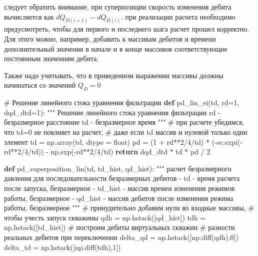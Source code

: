 \documentclass[
  russian,
  letterpaper,
  DIV=11,
  numbers=noendperiod,
  oneside]{scrartcl}
\newenvironment{Shaded}{\begin{snugshade}}{\end{snugshade}}
\newcommand{\BuiltInTok}[1]{\textcolor[rgb]{0.00,0.23,0.31}{#1}}
\newcommand{\CommentTok}[1]{\textcolor[rgb]{0.37,0.37,0.37}{#1}}
\newcommand{\ControlFlowTok}[1]{\textcolor[rgb]{0.00,0.23,0.31}{\textbf{#1}}}
\newcommand{\DecValTok}[1]{\textcolor[rgb]{0.68,0.00,0.00}{#1}}
\newcommand{\KeywordTok}[1]{\textcolor[rgb]{0.00,0.23,0.31}{\textbf{#1}}}
\newcommand{\NormalTok}[1]{\textcolor[rgb]{0.00,0.23,0.31}{#1}}
\newcommand{\OperatorTok}[1]{\textcolor[rgb]{0.37,0.37,0.37}{#1}}
\begin{document}
следует обратить внимание, при суперпозиции скорость изменения дебита
вычисляется как \(dQ_{D(i+1)} - dQ_{D(i)}\). при реализации расчета
необходимо предусмотреть, чтобы для первого и последнего шага расчет
прошел корректно. Для этого можно, например, добавить к массивам дебитов
и времени дополнительный значения в начале и в конце массивов
соответствующие постоянным значениям дебита.

Также надо учитывать, что в приведенном выражении массивы должны
начинаться со значений \(Q_D=0\)

\begin{Shaded}
\begin{Highlighting}[]
\CommentTok{\# Решение линейного стока уравнения фильтрации}
\KeywordTok{def}\NormalTok{ pd\_lin\_ei(td, rd}\OperatorTok{=}\DecValTok{1}\NormalTok{, dqd\_dtd}\OperatorTok{=}\DecValTok{1}\NormalTok{):}
    \CommentTok{"""}
\CommentTok{    Решение линейного стока уравнения фильтрации}
\CommentTok{    rd {-} безразмерное расстояние}
\CommentTok{    td {-} безразмерное время}
\CommentTok{    """}
    \CommentTok{\# при расчете убедимся, что td=0 не повлияет на расчет, }
    \CommentTok{\# даже если td массив и нулевой только один элемент}
\NormalTok{    td }\OperatorTok{=}\NormalTok{ np.array(td, dtype }\OperatorTok{=} \BuiltInTok{float}\NormalTok{)}
\NormalTok{    pd }\OperatorTok{=}\NormalTok{  (}\DecValTok{1} \OperatorTok{+}\NormalTok{ rd}\OperatorTok{**}\DecValTok{2}\OperatorTok{/}\DecValTok{4}\OperatorTok{/}\NormalTok{td) }\OperatorTok{*}\NormalTok{ (}\OperatorTok{{-}}\NormalTok{sc.expi(}\OperatorTok{{-}}\NormalTok{rd}\OperatorTok{**}\DecValTok{2}\OperatorTok{/}\DecValTok{4}\OperatorTok{/}\NormalTok{td)) }\OperatorTok{{-}}\NormalTok{ np.exp(}\OperatorTok{{-}}\NormalTok{rd}\OperatorTok{**}\DecValTok{2}\OperatorTok{/}\DecValTok{4}\OperatorTok{/}\NormalTok{td)}
    \ControlFlowTok{return}\NormalTok{ dqd\_dtd }\OperatorTok{*}\NormalTok{ td }\OperatorTok{*}\NormalTok{ pd }\OperatorTok{/} \DecValTok{2}

\KeywordTok{def}\NormalTok{ pd\_superposition\_lin(td, td\_hist, qd\_hist):}
    \CommentTok{"""}
\CommentTok{    расчет безразмерного давления для последовательности }
\CommentTok{    безразмерных дебитов}
\CommentTok{    {-} td {-}  время расчета после запуска, безразмерное}
\CommentTok{    {-} td\_hist {-} массив времен изменения режимов работы, безразмерное}
\CommentTok{    {-} qd\_hist {-} массив дебитов после изменения режима работы, безразмерное}
\CommentTok{    """}
    \CommentTok{\# принудительно добавим нули во входные массивы, }
    \CommentTok{\# чтобы учесть запуск скважины}
\NormalTok{    qdh }\OperatorTok{=}\NormalTok{ np.hstack([qd\_hist])}
\NormalTok{    tdh }\OperatorTok{=}\NormalTok{ np.hstack([td\_hist])}
    \CommentTok{\# построим дебиты виртуальных скважин }
    \CommentTok{\# разности реальных дебитов при переключении}
\NormalTok{    delta\_qd }\OperatorTok{=}\NormalTok{ np.hstack([np.diff(qdh),}\DecValTok{0}\NormalTok{])}
\NormalTok{    delta\_td }\OperatorTok{=}\NormalTok{ np.hstack([np.diff(tdh),}\DecValTok{1}\NormalTok{])}
    

\end{Highlighting}
\end{Shaded}
\end{document}
